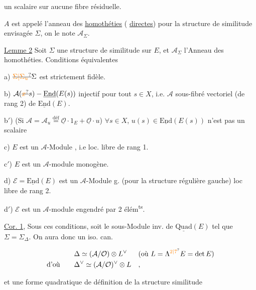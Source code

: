 un scalaire sur aucune fibre résiduelle.

$A$ est appelé l'anneau des \uline{homothéties} ( \uline{directes})  pour la structure de similitude envisagée $\Sigma$, on le note $\mathcal A_\Sigma$.

\uline{Lemme 2} Soit $\Sigma$ une structure de similitude sur $E$, et $\mathcal A_\Sigma$  l'Anneau des homothéties. Conditions équivalentes

a) $\deleted{\unsure{\Sigma|\Sigma_u}}\Sigma$ est strictement fidèle.

b)  $\mathcal A(\deleted{\unsure{x}}s)-\underline{\mathrm{End}}(E(s))$ injectif pour tout $s\in X$, i.e. $\mathcal A$ sous-fibré vectoriel (de rang 2) de $\underline{\mathrm{End}}(E)$.

b$'$) (Si $\mathcal A=\mathcal A_u\overset{\mathrm{déf}}{=}\underline{\mathcal O}\cdot1_E+\underline{\mathcal O}\cdot u$) $\forall s\in X$, $u(s)\in\underline{\mathrm{End}}(E(s))$ n'est pas un scalaire

c) $E$ est un $\mathcal A$-Module  , i.e loc. libre de rang 1.

c$'$) $E$ est un $\mathcal A$-module  monogène.

d) $\mathcal E=\underline{\mathrm{End}}(E)$ est un $\mathcal A$-Module  g. (pour la structure régulière gauche) loc libre de rang 2.

d$'$) $\mathcal E$ est un $\mathcal A$-module  engendré par 2 élém\textsuperscript{ts}.

\uline{Cor. 1}, Sous ces conditions, soit   le sous-Module  inv. de $\underline{\mathrm{Quad}}(E)$ tel que $\Sigma=\Sigma_\Delta$. On aura donc un iso. can.

\[
\begin{aligned}
&\Delta\simeq(\mathcal A/\mathcal O)\otimes L^\vee &&(\text{où } L=\Lambda^{\unsure{2|7}}E=\det E)\\
\text{d'où}\qquad&\Delta^\vee\simeq(\mathcal A/\mathcal O)^\vee\otimes L&&,
\end{aligned}
\]

et une  forme quadratique de définition de la structure   similitude

